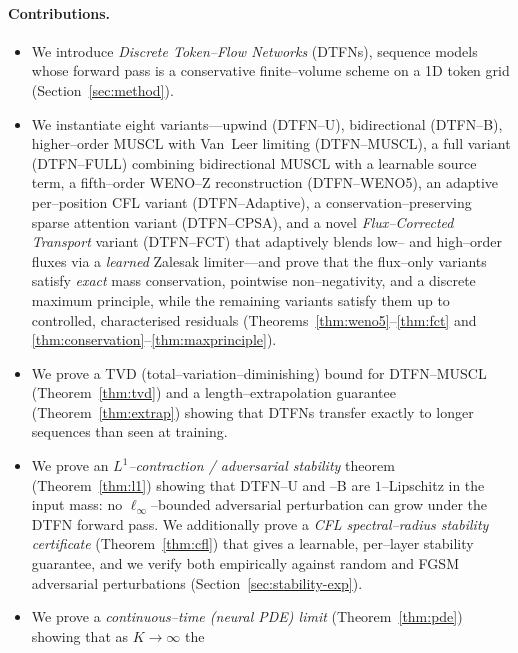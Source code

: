 \documentclass[10pt]{article}
\theoremstyle{definition}
\theoremstyle{remark}
\begin{document}
\paragraph{Contributions.}
\begin{itemize}[leftmargin=*,itemsep=2pt]
  \item We introduce \emph{Discrete Token--Flow Networks} (DTFNs),
        sequence models whose forward pass is a conservative
        finite--volume scheme on a 1D token grid (Section~\ref{sec:method}).
  \item We instantiate eight variants---upwind (DTFN--U),
        bidirectional (DTFN--B), higher--order MUSCL with Van~Leer
        limiting (DTFN--MUSCL), a full variant (DTFN--FULL) combining
        bidirectional MUSCL with a learnable source term, a
        fifth--order WENO--Z reconstruction (DTFN--WENO5), an adaptive
        per--position CFL variant (DTFN--Adaptive), a
        conservation--preserving sparse attention variant
        (DTFN--CPSA), and a novel \emph{Flux--Corrected Transport}
        variant (DTFN--FCT) that adaptively blends low-- and
        high--order fluxes via a \emph{learned} Zalesak limiter---and
        prove that the flux--only variants satisfy \emph{exact} mass
        conservation, pointwise non--negativity, and a discrete
        maximum principle, while the remaining variants satisfy them
        up to controlled, characterised residuals
        (Theorems~\ref{thm:weno5}--\ref{thm:fct}
        and \ref{thm:conservation}--\ref{thm:maxprinciple}).
  \item We prove a TVD (total--variation--diminishing) bound for
        DTFN--MUSCL (Theorem~\ref{thm:tvd}) and a length--extrapolation
        guarantee (Theorem~\ref{thm:extrap}) showing that DTFNs
        transfer exactly to longer sequences than seen at training.
  \item We prove an \emph{$L^1$--contraction / adversarial stability}
        theorem (Theorem~\ref{thm:l1}) showing that DTFN--U and --B
        are $1$--Lipschitz in the input mass: no $\ell_\infty$--bounded
        adversarial perturbation can grow under the DTFN forward pass.
        We additionally prove a \emph{CFL spectral--radius stability
        certificate} (Theorem~\ref{thm:cfl}) that gives a learnable,
        per--layer stability guarantee, and we verify both empirically
        against random and FGSM adversarial perturbations
        (Section~\ref{sec:stability-exp}).
  \item We prove a \emph{continuous--time (neural PDE) limit}
        (Theorem~\ref{thm:pde}) showing that as $K \to \infty$ the

\end{itemize}
\end{document}
